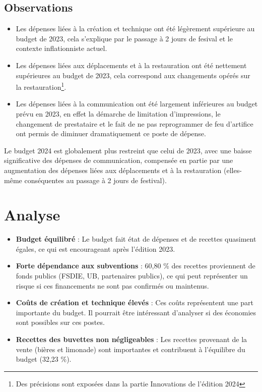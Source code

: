 \documentclass[12pt,a4paper]{report}
\begin{document}
\subsection{Observations}
\begin{itemize}
\item Les dépenses liées à la création et technique ont été légèrement supérieure au budget de 2023, cela s'explique par le passage à 2 jours de fesival et le contexte inflationniste actuel.
\item Les dépenses liées aux déplacements et à la restauration ont été nettement supérieures au budget de 2023, cela correspond aux changements opérés sur la restauration\footnote{Des précisions sont exposées dans la partie \og Innovations de l'édition 2024 \fg{}}.
\item Les dépenses liées à la communication ont été largement inférieures au budget prévu en 2023, en effet la démarche de limitation d'impressions, le changement de prestataire et le fait de ne pas reprogrammer de feu d'artifice ont permis de diminuer dramatiquement ce poste de dépense.\\
\end{itemize}

Le budget 2024 est globalement plus restreint que celui de 2023, avec une baisse significative des dépenses de communication, compensée en partie par une augmentation des dépenses liées aux déplacements et à la restauration (elles-même conséquentes au passage à 2 jours de festival).

\section{Analyse}
\begin{itemize}
\item \textbf{Budget équilibré} : Le budget fait état de dépenses et de recettes quasiment égales, ce qui est encourageant après l'édition 2023.
\item \textbf{Forte dépendance aux subventions} : 60,80 \% des recettes proviennent de fonds publics (FSDIE, UB, partenaires publics), ce qui peut représenter un risque si ces financements ne sont pas confirmés ou maintenus.
\item \textbf{Coûts de création et technique élevés} : Ces coûts représentent une part importante du budget. Il pourrait être intéressant d'analyser si des économies sont possibles sur ces postes.
\item \textbf{Recettes des buvettes non négligeables} : Les recettes provenant de la vente (bières et limonade) sont importantes et contribuent à l'équilibre du budget (32,23 \%).
\end{itemize}
\end{document}
